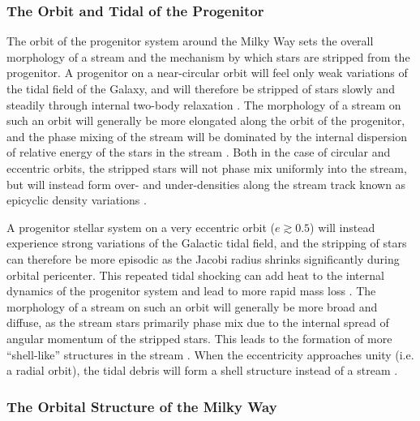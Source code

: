 \documentclass[final,5p,times,twocolumn,authoryear]{elsarticle}
\begin{document}
\subsubsection{The Orbit and Tidal  of the Progenitor}

The orbit of the progenitor system around the Milky Way sets the overall morphology of a
stream and the mechanism by which stars are stripped from the progenitor.
A progenitor on a near-circular orbit will feel only weak variations of the tidal field
of the Galaxy, and will therefore be stripped of stars slowly and steadily through
internal two-body relaxation \citep[e.g.,][]{kupper:2010}.
The morphology of a stream on such an orbit will generally be more elongated along the
orbit of the progenitor, and the phase mixing of the stream will be dominated by the
internal dispersion of relative energy of the stars in the stream
\citep[e.g.,][]{hendel:2015}.
Both in the case of circular and eccentric orbits, the stripped stars will not
phase mix uniformly into the stream, but will instead form over- and under-densities
along the stream track known as epicyclic density variations \citep{kupper:2008,kupper:2010,kupper:2012,just:2009,mastrobuono-battisti:2012}.

A progenitor stellar system on a very eccentric orbit ($e \gtrsim 0.5$) will instead
experience strong variations of the Galactic tidal field, and the stripping of stars can
therefore be more episodic as the Jacobi radius shrinks significantly during orbital
pericenter.
This repeated tidal shocking can add heat to the internal dynamics of the progenitor
system and lead to more rapid mass loss \citep[e.g.,][]{gnedin:1999}.
The morphology of a stream on such an orbit will generally be more broad and diffuse, as
the stream stars primarily phase mix due to the internal spread of angular momentum of
the stripped stars.
This leads to the formation of more ``shell-like'' structures in the stream
\citep[e.g.,][]{hendel:2015}.
When the eccentricity approaches unity (i.e. a radial orbit), the tidal debris will form
a shell structure instead of a stream \citep[e.g.,][]{hernquist:1987, sanderson:2013}.


\subsubsection{The Orbital Structure of the Milky Way}
\end{document}
